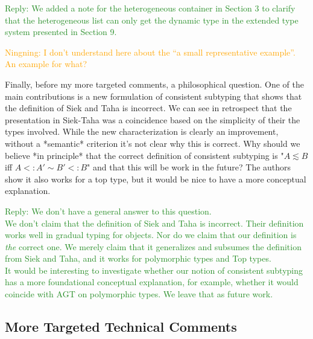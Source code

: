 \documentclass[dvipsnames]{article}
\newcommand\mynote[3]{\textcolor{#2}{#1: #3}}
\newcommand\ningning[1]{\mynote{Ningning}{orange}{#1}}
\newcommand\reply[1]{\textcolor{ForestGreen}{Reply: #1}}
\begin{document}
\reply{We added a note for the heterogeneous container in Section 3 to clarify
  that the heterogeneous list can only get the dynamic type in the extended type
  system presented in Section 9. }

\ningning{I don't understand here about the ``a small representative example''.
  An example for what?}

Finally, before my more targeted comments, a philosophical question. One of the
main contributions is a new formulation of consistent subtyping that shows that
the definition of Siek and Taha is incorrect. We can see in retrospect that the
presentation in Siek-Taha was a coincidence based on the simplicity of their the
types involved. While the new characterization is clearly an improvement,
without a *semantic* criterion it's not clear why this is correct. Why should we
believe *in principle* that the correct definition of consistent subtyping is
"$A \lesssim B$ iff $A <: A' \sim B' <: B$" and that this will be work in the
future? The authors show it also works for a top type, but it would be nice to
have a more conceptual explanation.

\reply{We don't have a general answer to this question.\\
  We don't claim that the definition of Siek and Taha is incorrect. Their
  definition works well in gradual typing for objects. Nor do we claim that
  our definition is \emph{the} correct one. We merely claim that it
  generalizes and subsumes the definition from Siek and Taha, and it works for
  polymorphic types and Top types.\\
  It would be interesting to investigate whether our notion of consistent
  subtyping has a more foundational conceptual explanation, for example, whether
  it would coincide with AGT on polymorphic types. We leave that as future
  work.}


\subsection{More Targeted Technical Comments}
\end{document}

